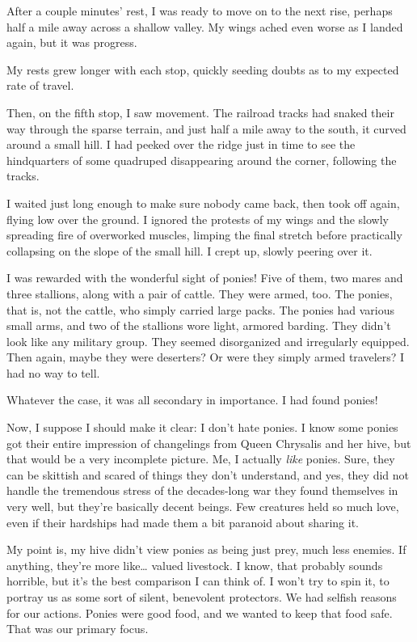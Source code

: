 After a couple minutes' rest, I was ready to move on to the next rise, perhaps half a mile away across a shallow valley. My wings ached even worse as I landed again, but it was progress.

My rests grew longer with each stop, quickly seeding doubts as to my expected rate of travel.

Then, on the fifth stop, I saw movement. The railroad tracks had snaked their way through the sparse terrain, and just half a mile away to the south, it curved around a small hill. I had peeked over the ridge just in time to see the hindquarters of some quadruped disappearing around the corner, following the tracks.

I waited just long enough to make sure nobody came back, then took off again, flying low over the ground. I ignored the protests of my wings and the slowly spreading fire of overworked muscles, limping the final stretch before practically collapsing on the slope of the small hill. I crept up, slowly peering over it.

I was rewarded with the wonderful sight of ponies! Five of them, two mares and three stallions, along with a pair of cattle. They were armed, too. The ponies, that is, not the cattle, who simply carried large packs. The ponies had various small arms, and two of the stallions wore light, armored barding. They didn’t look like any military group. They seemed disorganized and irregularly equipped. Then again, maybe they were deserters? Or were they simply armed travelers? I had no way to tell.

Whatever the case, it was all secondary in importance. I had found ponies!

Now, I suppose I should make it clear: I don’t hate ponies. I know some ponies got their entire impression of changelings from Queen Chrysalis and her hive, but that would be a very incomplete picture. Me, I actually \textit{like} ponies. Sure, they can be skittish and scared of things they don’t understand, and yes, they did not handle the tremendous stress of the decades-long war they found themselves in very well, but they’re basically decent beings. Few creatures held so much love, even if their hardships had made them a bit paranoid about sharing it.

My point is, my hive didn’t view ponies as being just prey, much less enemies. If anything, they’re more like… valued livestock. I know, that probably sounds horrible, but it’s the best comparison I can think of. I won’t try to spin it, to portray us as some sort of silent, benevolent protectors. We had selfish reasons for our actions. Ponies were good food, and we wanted to keep that food safe. That was our primary focus.

